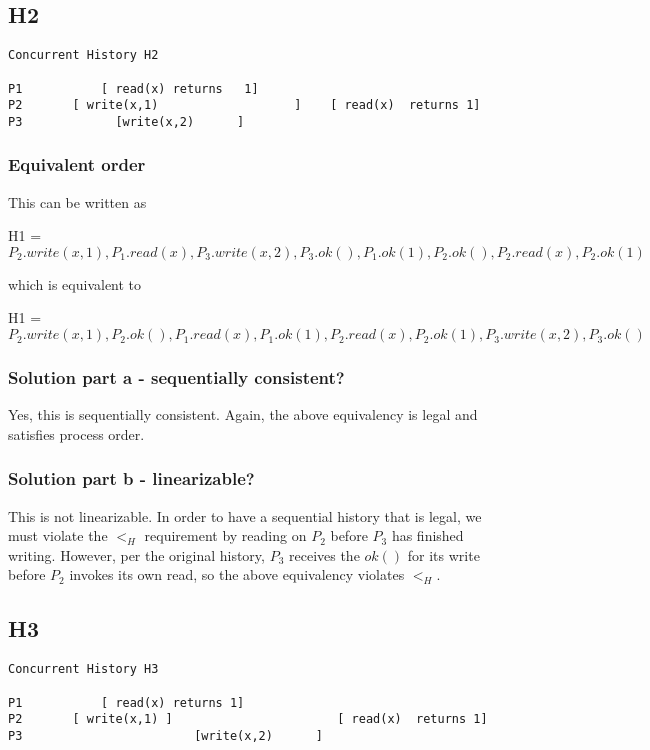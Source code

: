 \documentclass{article}
\begin{document}
\subsection{H2}
\begin{verbatim}
Concurrent History H2

P1           [ read(x) returns   1]
P2       [ write(x,1)                   ]    [ read(x)  returns 1]
P3             [write(x,2)      ]            
\end{verbatim}

\subsubsection{Equivalent order}
This can be written as

H1 = $P_2.write(x, 1), P_1.read(x), P_3.write(x, 2), P_3.ok(), P_1.ok(1), P_2.ok(), P_2.read(x), P_2.ok(1)$

which is equivalent to 

H1 = $P_2.write(x, 1), P_2.ok(), P_1.read(x), P_1.ok(1), P_2.read(x), P_2.ok(1), P_3.write(x, 2), P_3.ok()$

\subsubsection{Solution part a - sequentially consistent?}
Yes, this is sequentially consistent. Again, the above equivalency is legal and satisfies process order.
\subsubsection{Solution part b - linearizable?}
This is not linearizable. In order to have a sequential history that is legal, we must violate the $<_H$ requirement by reading on $P_2$ before $P_3$ has finished writing. However, per the original history, $P_3$ receives the $ok()$ for its write before $P_2$ invokes its own read, so the above equivalency violates $<_H$.

\subsection{H3}
\begin{verbatim}
Concurrent History H3

P1           [ read(x) returns 1]
P2       [ write(x,1) ]                       [ read(x)  returns 1]
P3                        [write(x,2)      ]            
\end{verbatim}
\end{document}
